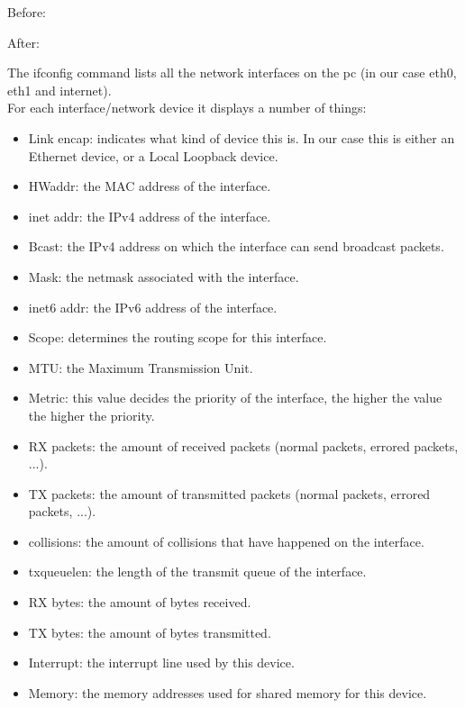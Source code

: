 Before: \newline

After: \newline


The ifconfig command lists all the network interfaces on the pc (in our case eth0, eth1 and internet). \\

For each interface/network device it displays a number of things: \\
\begin{itemize}
	\item Link encap: indicates what kind of device this is. In our case this is either an Ethernet device, or a Local Loopback device.
	\item HWaddr: the MAC address of the interface.
	\item inet addr: the IPv4 address of the interface.
	\item Bcast: the IPv4 address on which the interface can send broadcast packets.
	\item Mask: the netmask associated with the interface.
	\item inet6 addr: the IPv6 address of the interface.
	\item Scope: determines the routing scope for this interface. 
	\item MTU: the Maximum Transmission Unit.
	\item Metric: this value decides the priority of the interface, the higher the value the higher the priority.
	\item RX packets: the amount of received packets (normal packets, errored packets, ...).
	\item TX packets: the amount of transmitted packets (normal packets, errored packets, ...).
	\item collisions: the amount of collisions that have happened on the interface.
	\item txqueuelen: the length of the transmit queue of the interface.
	\item RX bytes: the amount of bytes received.
	\item TX bytes: the amount of bytes transmitted.
	\item Interrupt: the interrupt line used by this device.
	\item Memory: the memory addresses used for shared memory for this device.
\end{itemize}
